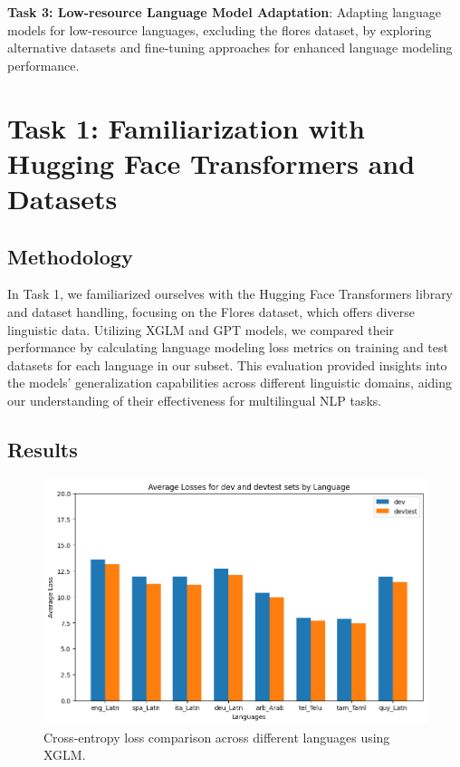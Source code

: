 \documentclass[11pt]{article}
\begin{document}
\textbf{Task 3: Low-resource Language Model Adaptation}: Adapting language models for low-resource languages, excluding the flores dataset, by exploring alternative datasets and fine-tuning approaches for enhanced language modeling performance.

\section{Task 1: Familiarization with Hugging Face Transformers and Datasets}

\subsection{Methodology}

In Task 1, we familiarized ourselves with the Hugging Face Transformers library and dataset handling, focusing on the Flores dataset, which offers diverse linguistic data. Utilizing XGLM and GPT models, we compared their performance by calculating language modeling loss metrics on training and test datasets for each language in our subset. This evaluation provided insights into the models' generalization capabilities across different linguistic domains, aiding our understanding of their effectiveness for multilingual NLP tasks.

\subsection{Results}

\begin{figure}[ht]
\centering
\includegraphics[width=0.9\columnwidth]{task1_xglm_results.png}
\caption{Cross-entropy loss comparison across different languages using XGLM.}
\end{figure}
\end{document}
